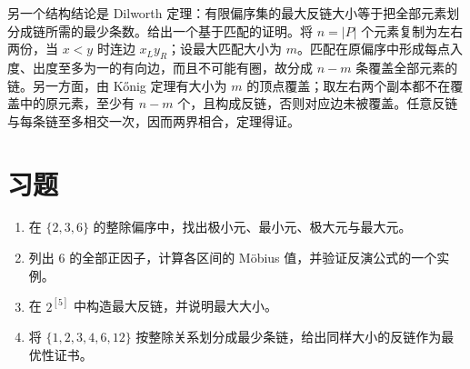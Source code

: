 另一个结构结论是 Dilworth 定理：有限偏序集的最大反链大小等于把全部元素划分成链所需的最少条数。给出一个基于匹配的证明。将 $n=|P|$ 个元素复制为左右两份，当 $x<y$ 时连边 $x_Ly_R$；设最大匹配大小为 $m$。匹配在原偏序中形成每点入度、出度至多为一的有向边，而且不可能有圈，故分成 $n-m$ 条覆盖全部元素的链。另一方面，由 K\H{o}nig 定理有大小为 $m$ 的顶点覆盖；取左右两个副本都不在覆盖中的原元素，至少有 $n-m$ 个，且构成反链，否则对应边未被覆盖。任意反链与每条链至多相交一次，因而两界相合，定理得证。

\section{习题}
\begin{enumerate}
  \item\label{ex:posets-1} 在 $\{2,3,6\}$ 的整除偏序中，找出极小元、最小元、极大元与最大元。
  \item\label{ex:posets-2} 列出 $6$ 的全部正因子，计算各区间的 M\"obius 值，并验证反演公式的一个实例。
  \item\label{ex:posets-3} 在 $2^{[5]}$ 中构造最大反链，并说明最大大小。
  \item\label{ex:posets-4} 将 $\{1,2,3,4,6,12\}$ 按整除关系划分成最少条链，给出同样大小的反链作为最优性证书。
\end{enumerate}

